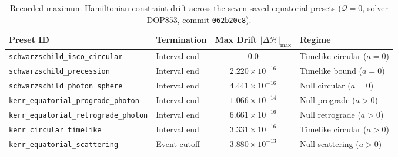 \begin{table}[htbp]
\centering
\footnotesize
\setlength{\tabcolsep}{4pt}
\caption{Recorded maximum Hamiltonian constraint drift across the seven saved equatorial presets ($\mathcal{Q} = 0$, solver \textsc{DOP853}, commit \texttt{062b20c8}).}
\label{tab:preset_drift_ledger}
\begin{tabular}{@{}llcl@{}}
\toprule
\textbf{Preset ID} & \textbf{Termination} & \textbf{Max Drift} $|\Delta\mathcal{H}|_{\max}$ & \textbf{Regime} \\
\midrule
\texttt{schwarzschild\_isco\_circular} & Interval end & $0.0$ & Timelike circular ($a=0$) \\
\texttt{schwarzschild\_precession} & Interval end & $2.220 \times 10^{-16}$ & Timelike bound ($a=0$) \\
\texttt{schwarzschild\_photon\_sphere} & Interval end & $4.441 \times 10^{-16}$ & Null circular ($a=0$) \\
\texttt{kerr\_equatorial\_prograde\_photon} & Interval end & $1.066 \times 10^{-14}$ & Null prograde ($a > 0$) \\
\texttt{kerr\_equatorial\_retrograde\_photon} & Interval end & $6.661 \times 10^{-16}$ & Null retrograde ($a > 0$) \\
\texttt{kerr\_circular\_timelike} & Interval end & $3.331 \times 10^{-16}$ & Timelike circular ($a > 0$) \\
\texttt{kerr\_equatorial\_scattering} & Event cutoff & $3.880 \times 10^{-13}$ & Null scattering ($a > 0$) \\
\bottomrule
\end{tabular}
\end{table}
